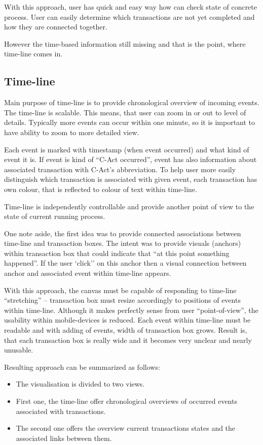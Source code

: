 With this approach, user has quick and easy way how can check state of concrete process. User can easily determine which transactions are not yet completed and how they are connected  together. 

However the time-based information still missing and that is the point, where time-line comes in.
\subsection{Time-line}
Main purpose of time-line is to provide chronological overview of incoming events. The time-line is scalable. This means, that user can zoom in or out to level of details. Typically more events can occur within one minute, so it is important to have ability to zoom to more detailed view. 

Each event is marked with timestamp (when event occurred) and what kind of event it is. If event is kind of ``C-Act occurred'', event has also information about associated transaction with C-Act's abbreviation. To help user more easily distinguish which transaction is associated with given event, each transaction has own colour, that is reflected to colour of text within time-line. 

Time-line is independently controllable and provide another point of view to the state of current running process. 

One note aside, the first idea was to provide connected associations between time-line and transaction boxes. The intent was to provide visuals (anchors) within transaction box that could indicate that ``at this point something happened''. If the user `click'' on this anchor then a visual connection between anchor and associated event within time-line appears. 

With this approach, the canvas must be capable of responding to time-line ``stretching'' -- transaction box must resize accordingly to positions of events within time-line. Although it makes perfectly sense from user ``point-of-view'', the usability within mobile-devices is reduced. Each event within time-line must be readable and with adding of events, width of transaction box grows. Result is, that each transaction box is really wide and it becomes very unclear and nearly unusable.

Resulting approach can be summarized as follows:
\begin{itemize}
\item The visualisation is divided to two views.
\item First one, the time-line offer chronological overviews of occurred events associated with transactions.
\item The second one offers the overview current transactions states and the associated links between them. 
\end{itemize}
